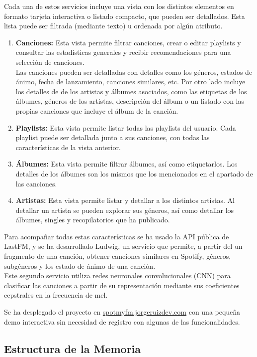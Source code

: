 Cada una de estos servicios incluye una vista con los distintos elementos en formato tarjeta interactiva o listado compacto, que pueden ser detallados. Esta lista puede ser filtrada (mediante texto) u ordenada por algún atributo.

\begin{enumerate}
    \item \textbf{Canciones:} Esta vista permite filtrar canciones, crear o editar playlists y consultar las estadísticas generales y recibir recomendaciones para una selección de canciones.\\
    Las canciones pueden ser detalladas con detalles como los géneros, estados de ánimo, fecha de lanzamiento, canciones similares, etc.
    Por otro lado incluye los detalles de de los artistas y álbumes asociados, como las etiquetas de los álbumes, géneros de los artistas, descripción del álbum o un listado con las propias canciones que incluye el álbum de la canción.
    \item \textbf{Playlists:} Esta vista permite listar todas las playlists del usuario. Cada playlist puede ser detallada junto a sus canciones, con todas las características de la vista anterior. 
    \item \textbf{Álbumes:} Esta vista permite filtrar álbumes, así como etiquetarlos. Los detalles de los álbumes son los mismos que los mencionados en el apartado de las canciones.
    \item \textbf{Artistas:} Esta vista permite listar y detallar a los distintos artistas. Al detallar un artista se pueden explorar sus géneros, así como detallar los álbumes, singles y recopilatorios que ha publicado.
\end{enumerate}

Para acompañar todas estas características se ha usado la API pública de LastFM, y se ha desarrollado Ludwig, un servicio que permite, a partir del un fragmento de una canción, obtener canciones similares en Spotify, géneros, subgéneros y los estado de ánimo de una canción. \\
Este segundo servicio utiliza redes neuronales convolucionales (CNN) para clasificar las canciones a partir de su representación mediante sus coeficientes cepstrales en la frecuencia de mel.

Se ha desplegado el proyecto en \href{https://spotmyfm.jorgeruizdev.com}{spotmyfm.jorgeruizdev.com} con una pequeña demo interactiva sin necesidad de registro con algunas de las funcionalidades. 

\subsection{Estructura de la Memoria}


